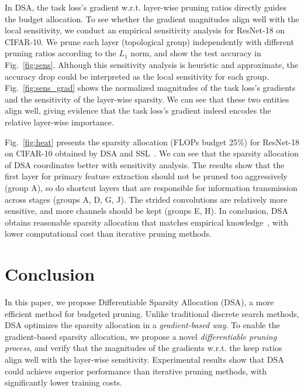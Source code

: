 \documentclass[runningheads]{llncs}
\newcommand{\dsa}{DSA\xspace}
\begin{document}
  In DSA, the task loss's gradient w.r.t. layer-wise pruning ratios directly guides the budget allocation. To see whether the gradient magnitudes align well with the local sensitivity, we conduct an empirical sensitivity analysis for ResNet-18 on CIFAR-10. We prune each layer (topological group) independently with different pruning ratios according to the $L_1$ norm, and show the test accuracy in Fig.~\ref{fig:sens}. Although this sensitivity analysis is heuristic and approximate, the accuracy drop could be interpreted as the local sensitivity for each group. Fig.~\ref{fig:sens_grad} shows the normalized magnitudes of the task loss's gradients and the sensitivity of the layer-wise sparsity. We can see that these two entities align well, giving evidence that the task loss's gradient indeed encodes the relative layer-wise importance.
  
  
  
  Fig.~\ref{fig:heat} presents the sparsity allocation (FLOPs budget 25\%) for ResNet-18 on CIFAR-10 obtained by \dsa and SSL~\cite{grouplasso}.
  We can see that the sparsity allocation of DSA coordinates better with sensitivity analysis. The results show that the first layer for primary feature extraction should not be pruned too aggressively (group A), so do shortcut layers that are responsible for information transmission across stages (groups A, D, G, J). The strided convolutions are relatively more sensitive, and more channels should be kept (groups E, H). In conclusion, DSA obtains reasonable sparsity allocation that matches empirical knowledge~\cite{liu2019metapruning,rethinking}, with lower computational cost than iterative pruning methods.
  
  
  \section{Conclusion}
  \label{sec:conclusion}
  In this paper, we propose Differentiable Sparsity Allocation (DSA), a more efficient method for budgeted pruning. Unlike traditional discrete search methods, DSA optimizes the sparsity allocation in a \textit{gradient-based way}.  To enable the gradient-based sparsity allocation, we propose a novel \textit{differentiable pruning process},
  and verify that the magnitudes of the gradients w.r.t. the keep ratios align well with the layer-wise sensitivity. 
  Experimental results show that DSA could achieve superior performance than iterative pruning methods, with significantly lower training costs.
  
  \clearpage
  
\end{document}
